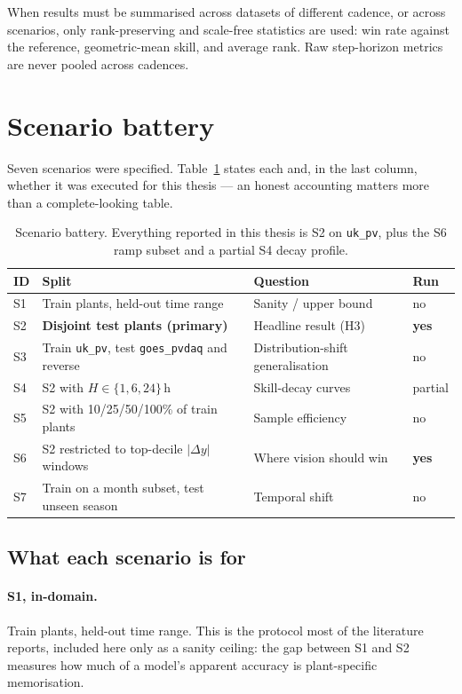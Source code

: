 When results must be summarised across datasets of different cadence, or across scenarios,
only rank-preserving and scale-free statistics are used: win rate against the reference,
geometric-mean skill, and average rank. Raw step-horizon metrics are never pooled across
cadences.

\section{Scenario battery}
\label{sec:scenarios}

Seven scenarios were specified. Table~\ref{tab:scenarios} states each and, in the last
column, whether it was executed for this thesis --- an honest accounting matters more than
a complete-looking table.

\begin{table}[h!]
\centering
\small
\begin{tabular}{l p{5.4cm} p{4.4cm} l}
\hline
\textbf{ID} & \textbf{Split} & \textbf{Question} & \textbf{Run} \\
\hline
S1 & Train plants, held-out time range & Sanity / upper bound & no \\
S2 & \textbf{Disjoint test plants (primary)} & Headline result (H3) & \textbf{yes} \\
S3 & Train \texttt{uk\_pv}, test \texttt{goes\_pvdaq} and reverse & Distribution-shift
generalisation & no \\
S4 & S2 with $H \in \{1,6,24\}$\,h & Skill-decay curves & partial \\
S5 & S2 with 10/25/50/100\% of train plants & Sample efficiency & no \\
S6 & S2 restricted to top-decile $|\Delta y|$ windows & Where vision should win &
\textbf{yes} \\
S7 & Train on a month subset, test unseen season & Temporal shift & no \\
\hline
\end{tabular}
\caption{Scenario battery. Everything reported in this thesis is S2 on \texttt{uk\_pv},
plus the S6 ramp subset and a partial S4 decay profile.}
\label{tab:scenarios}
\end{table}

\subsection{What each scenario is for}

\paragraph{S1, in-domain.} Train plants, held-out time range. This is the protocol most of the
literature reports, included here only as a sanity ceiling: the gap between S1 and S2 measures
how much of a model's apparent accuracy is plant-specific memorisation.

